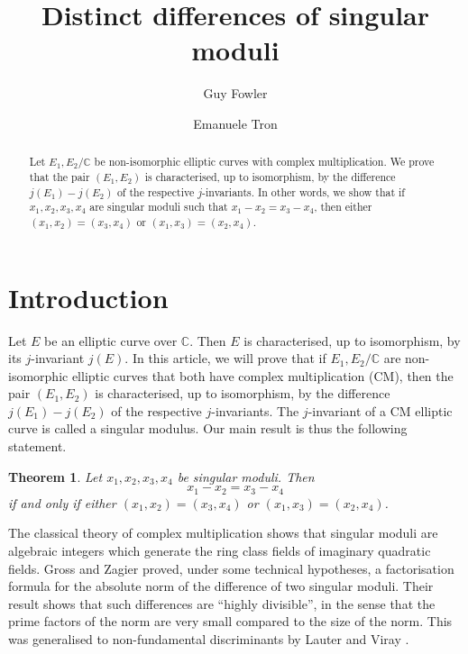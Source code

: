\documentclass[12pt,a4paper,oneside]{amsart}
\title{Distinct differences of singular moduli}
\author{Guy Fowler}
\author{Emanuele Tron}
\newtheorem{theorem}{Theorem}[section]
\begin{document}
	
	\begin{abstract}
		Let $E_1, E_2 / \mathbb{C}$ be non-isomorphic elliptic curves with complex multiplication. We prove that the pair $(E_1, E_2)$ is characterised, up to isomorphism, by the difference $j(E_1) - j(E_2)$ of the respective $j$-invariants. In other words, we show that if $x_1, x_2, x_3, x_4$ are singular moduli such that $x_1 - x_2 = x_3 - x_4$, then either $(x_1, x_2) = (x_3, x_4)$ or $(x_1, x_3) = (x_2, x_4)$.
	\end{abstract}	
	
	\maketitle
	
	\section{Introduction}
	
	Let $E$ be an elliptic curve over $\mathbb{C}$. Then $E$ is characterised, up to isomorphism, by its $j$-invariant $j(E)$. In this article, we will prove that if $E_1, E_2 / \mathbb{C}$ are non-isomorphic elliptic curves that both have complex multiplication (CM), then the pair $(E_1, E_2)$ is characterised, up to isomorphism, by the difference $j(E_1) - j(E_2)$ of the respective $j$-invariants. The $j$-invariant of a CM elliptic curve is called a singular modulus. Our main result is thus the following statement.
	
	\begin{theorem}\label{thm:main}
	Let $x_1, x_2, x_3, x_4$ be singular moduli. Then
		\[x_1 - x_2 = x_3 - x_4\]
		if and only if either $(x_1, x_2) = (x_3, x_4)$ or $(x_1, x_3) = (x_2, x_4)$.
	\end{theorem}
	
	\medskip
	
	The classical theory of complex multiplication shows that singular moduli are algebraic integers which generate the ring class fields of imaginary quadratic fields. Gross and Zagier \cite{GrossZagier85} proved, under some technical hypotheses, a factorisation formula for the absolute norm of the difference of two singular moduli. Their result shows that such differences are ``highly divisible'', in the sense that the prime factors of the norm are very small compared to the size of the norm. This was generalised to non-fundamental discriminants by Lauter and Viray \cite{LauterViray15}.
	
\end{document}
